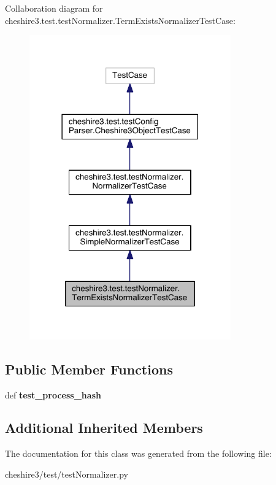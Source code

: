 Collaboration diagram for cheshire3.\-test.\-test\-Normalizer.\-Term\-Exists\-Normalizer\-Test\-Case\-:
\nopagebreak
\begin{figure}[H]
\begin{center}
\leavevmode
\includegraphics[width=246pt]{classcheshire3_1_1test_1_1test_normalizer_1_1_term_exists_normalizer_test_case__coll__graph}
\end{center}
\end{figure}
\subsection*{Public Member Functions}
\begin{DoxyCompactItemize}
\item 
\hypertarget{classcheshire3_1_1test_1_1test_normalizer_1_1_term_exists_normalizer_test_case_a4831b2fc9c7071cd2cc1b9d1cfcfe8b4}{def {\bfseries test\-\_\-process\-\_\-hash}}\label{classcheshire3_1_1test_1_1test_normalizer_1_1_term_exists_normalizer_test_case_a4831b2fc9c7071cd2cc1b9d1cfcfe8b4}

\end{DoxyCompactItemize}
\subsection*{Additional Inherited Members}


The documentation for this class was generated from the following file\-:\begin{DoxyCompactItemize}
\item 
cheshire3/test/test\-Normalizer.\-py\end{DoxyCompactItemize}
